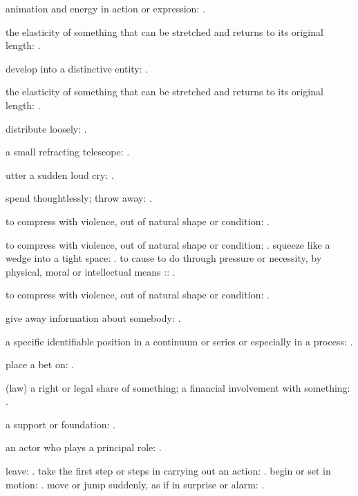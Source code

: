   animation and energy in action or expression: .

  the elasticity of something that can be stretched and returns to its original length: .

  develop into a distinctive entity: .

  the elasticity of something that can be stretched and returns to its original length: .

  distribute loosely: .

  a small refracting telescope: .

  utter a sudden loud cry: .

  spend thoughtlessly; throw away: .

  to compress with violence, out of natural shape or condition: .

  to compress with violence, out of natural shape or condition: . squeeze like a wedge into a tight space: . to cause to do through pressure or necessity, by physical, moral or intellectual means :: .

  to compress with violence, out of natural shape or condition: .

  give away information about somebody: .

  a specific identifiable position in a continuum or series or especially in a process: .

  place a bet on: .

  (law) a right or legal share of something; a financial involvement with something: .

  a support or foundation: .

  an actor who plays a principal role: .

  leave: . take the first step or steps in carrying out an action: . begin or set in motion: . move or jump suddenly, as if in surprise or alarm: .


